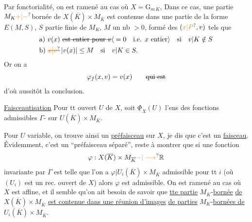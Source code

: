 Par fonctorialité, on est ramené au cas où $X=\mathrm G_{m\,K}$,    Dans ce cas,  une partie $M_K\unsure{+|-}$bornée de $X(\overline K)\times M_{\overline K}$  est contenue dans une partie de la forme $E(M,S)$, $S$ partie finie de $M_K$,  $M$ un nb $>0$, formé des $(\unsure{x|P},v)$ tels que
\[
\begin{aligned}
&\text{a) }v(x)\ \deleted{\text{est entier pour }v}\inserted{{}=0\quad\text{i.e. }x\text{ entier}}\quad\text{si}\quad v|K\notin S\\
&\text{b) }\deleted{\unsure{x|v}}\,|v(x)|\leq M\quad\text{si}\quad v|K\in S.
\end{aligned}
\]
Or on a
\[
\varphi_f(x,v)=v(x)\qquad\deleted{\text{qui est}}
\]
d'où aussitôt la conclusion.

\uline{Faisceautisation} Pour tt ouvert $U$ de $X$, soit $\underline{\Phi}_X(U)$ l'ens des fonctions admissibles $\Gamma$- sur $U(\overline K)\times M_{\overline K}$.

Pour $U$ variable, on trouve ainsi un \uline{préfaisceau}  sur $X$, je dis que c'est un \uline{faisceau}. Évidemment, c'est un ``préfaisceau séparé'', reste à montrer que si une fonction
\[
\varphi:X(\overline K)\times M_{\overline K}\unsure{-|\longrightarrow}\mathbb R
\]
invariante par $\Gamma$ est telle que l'on a $\varphi|U_i(\overline K)\times M_{\overline K}$ admissible pour tt $i$ (où $(U_i)$ est un rec. ouvert de $X$) alors $\varphi$ est admissible. On est ramené au cas où $X$ est affine, et il semble qu'on ait besoin de savoir que  \uline{tte partie} $M_K$-\uline{bornée} \uline{de} $X(\overline K)\times M_{\overline K}$
\uline{est contenue dans une réunion d'images} \uline{de parties} $M_K$-\uline{bornées de} $U_i(\overline K)\times M_{\overline K}$.

